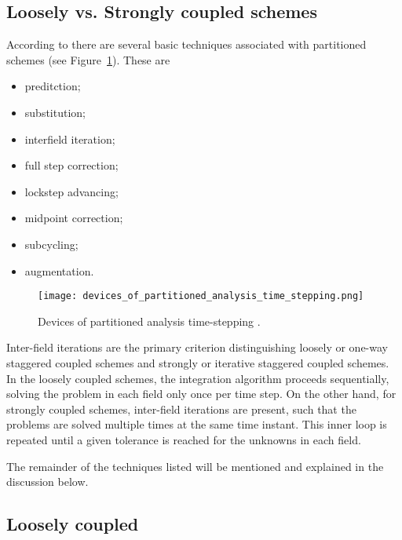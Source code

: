 \subsection{Loosely vs. Strongly coupled schemes}


According to \cite{felippa_partitioned_2001} there are several basic techniques associated with partitioned schemes (see Figure~\ref{fig:devices_of_partitioned_analysis_time_stepping}).
These are
\begin{itemize}
  \item preditction;
  \item substitution;
  \item interfield iteration;
  \item full step correction;
  \item lockstep advancing;
  \item midpoint correction;
  \item subcycling;
  \item augmentation.
\end{itemize}

\begin{figure}[htbp]
  \texttt{[image: devices\_of\_partitioned\_analysis\_time\_stepping.png]}
  \caption{Devices of partitioned analysis time-stepping \citep{felippa_partitioned_2001}.}
\label{fig:devices_of_partitioned_analysis_time_stepping}
\end{figure}

Inter-field iterations are the primary criterion distinguishing loosely or one-way staggered coupled schemes and strongly or iterative staggered coupled schemes.
In the loosely coupled schemes, the integration algorithm proceeds sequentially, solving the problem in each field only once per time step.
On the other hand, for strongly coupled schemes, inter-field iterations are present, such that the problems are solved multiple times at the same time instant.
This inner loop is repeated until a given tolerance is reached for the unknowns in each field.

The remainder of the techniques listed will be mentioned and explained in the discussion below.

\subsection{Loosely coupled}



